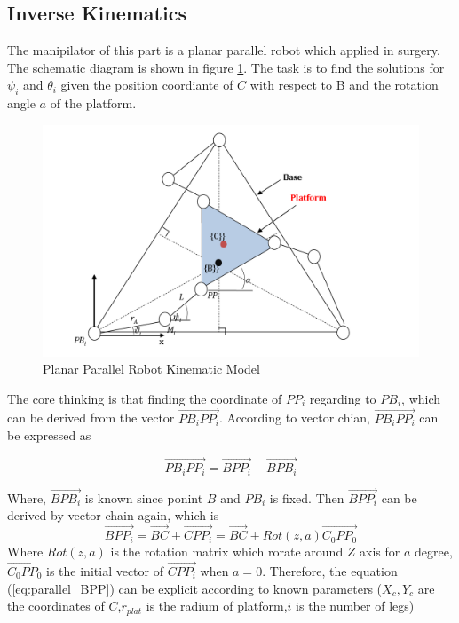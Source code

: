 \documentclass{article}
\begin{document}
\subsection{Inverse Kinematics}
The manipilator of this part is a planar parallel robot which applied in surgery. The schematic diagram is shown in  figure \ref{fig:Parallel}. The task is to find the solutions for $\psi_i$ and $\theta_i$ given the position coordiante of $C$ with respect to B and the rotation angle $a$ of the platform.
\begin{figure}[htbp] 
\begin{center}
\includegraphics[width=\textwidth]{images/Parallel}
\caption{Planar Parallel Robot Kinematic Model}
\label{fig:Parallel}
\end{center}
\end{figure}

The core thinking is that finding the coordinate of $PP_i$ regarding to $PB_i$, which can be derived from the vector  $\overrightarrow{PB_i PP_i}$. According to vector chian, $\overrightarrow{PB_i PP_i}$ can be expressed as

\begin{equation}
\overrightarrow{PB_i PP_i} = \overrightarrow{B PP_i} - \overrightarrow{B PB_i}
\end{equation}

Where, $\overrightarrow{B PB_i}$ is known since ponint $B$ and $PB_i$ is fixed. Then $\overrightarrow{B PP_i}$ can be derived by vector chain again, which is
\begin{equation}
\label{eq:parallel_BPP}
\overrightarrow{B PP_i} = \overrightarrow{BC} + \overrightarrow{C PP_i} = \overrightarrow{BC} + Rot(z,a)\overrightarrow{C_0PP_0} 
\end{equation}
Where $Rot(z,a)$ is the rotation matrix which rorate around $Z$ axis for $a$ degree, $\overrightarrow{C_0PP_0}$ is the initial vector of $\overrightarrow{C PP_i}$ when $a=0$. Therefore, the equation (\ref{eq:parallel_BPP}) can be explicit according to known parameters ($X_c,Y_c$ are the coordinates of $C$,$r_{plat}$ is the radium of platform,$i$ is the number of legs)
\end{document}
